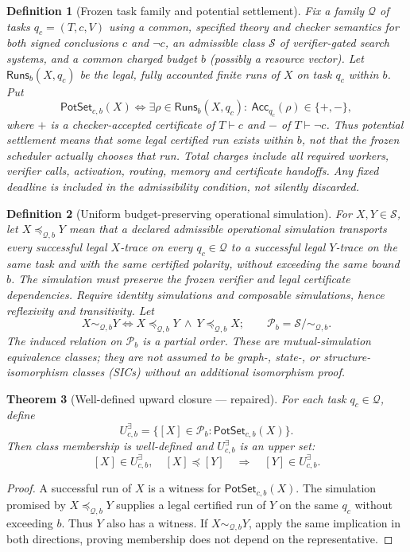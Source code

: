 \documentclass[11pt,letterpaper]{article}
\newtheorem{definition}{Definition}[section]
\newtheorem{theorem}[definition]{Theorem}
\theoremstyle{remark}
\newcommand{\Runs}{\mathsf{Runs}}
\newcommand{\Acc}{\mathsf{Acc}}
\newcommand{\subpre}{\preccurlyeq_{\mathcal Q,b}}
\newcommand{\equsim}{\mathrel{\sim_{\mathcal Q,b}}}
\begin{document}
\begin{definition}[Frozen task family and potential settlement]\label{def:potential}
Fix a family $\mathcal Q$ of tasks $q_c=(T,c,V)$ using a common, specified theory and checker semantics for both signed conclusions $c$ and $\neg c$, an admissible class $\mathcal S$ of verifier-gated search systems, and a common charged budget $b$ (possibly a resource vector). Let $\Runs_b(X,q_c)$ be the legal, fully accounted finite runs of $X$ on task $q_c$ within $b$. Put
\[\mathsf{PotSet}_{c,b}(X)\iff \exists\rho\in\Runs_b(X,q_c):\ \Acc_{q_c}(\rho)\in\{+, -\},\]
where $+$ is a checker-accepted certificate of $T\vdash c$ and $-$ of $T\vdash\neg c$. Thus \emph{potential settlement} means that \emph{some} legal certified run exists within $b$, not that the frozen scheduler actually chooses that run. Total charges include all required workers, verifier calls, activation, routing, memory and certificate handoffs. Any fixed deadline is included in the admissibility condition, not silently discarded.
\end{definition}
\begin{definition}[Uniform budget-preserving operational simulation]\label{def:sim}
For $X,Y\in\mathcal S$, let $X\subpre Y$ mean that a declared admissible operational simulation transports \emph{every} successful legal $X$-trace on \emph{every} $q_c\in\mathcal Q$ to a successful legal $Y$-trace on the same task and with the same certified polarity, \emph{without exceeding the same bound $b$}. The simulation must preserve the frozen verifier and legal certificate dependencies. Require identity simulations and composable simulations, hence reflexivity and transitivity. Let
\[X\equsim Y\iff X\subpre Y\ \wedge\ Y\subpre X;\qquad\mathcal P_b=\mathcal S/{\sim_{\mathcal Q,b}}.\]
The induced relation on $\mathcal P_b$ is a partial order. These are \emph{mutual-simulation equivalence classes}; they are not assumed to be graph-, state-, or structure-isomorphism classes (SICs) without an additional isomorphism proof.
\end{definition}
\begin{theorem}[Well-defined upward closure --- repaired]\label{thm:upward}
For each task $q_c\in\mathcal Q$, define
\[U^{\exists}_{c,b}=\{[X]\in\mathcal P_b:\mathsf{PotSet}_{c,b}(X)\}.\]
Then class membership is well-defined and $U^{\exists}_{c,b}$ is an upper set: 
\[[X]\in U^{\exists}_{c,b},\quad[X]\preccurlyeq[Y]\quad\Longrightarrow\quad[Y]\in U^{\exists}_{c,b}.\]
\end{theorem}
\begin{proof}
A successful run of $X$ is a witness for $\mathsf{PotSet}_{c,b}(X)$. The simulation promised by $X\subpre Y$ supplies a legal certified run of $Y$ on the same $q_c$ without exceeding $b$. Thus $Y$ also has a witness. If $X\equsim Y$, apply the same implication in both directions, proving membership does not depend on the representative.
\end{proof}
\end{document}
